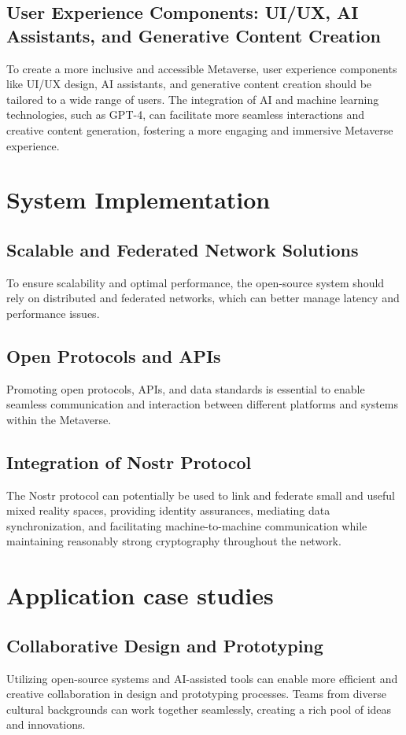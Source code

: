 \subsection{User Experience Components: UI/UX, AI Assistants, and Generative Content Creation}
To create a more inclusive and accessible Metaverse, user experience components like UI/UX design, AI assistants, and generative content creation should be tailored to a wide range of users. The integration of AI and machine learning technologies, such as GPT-4, can facilitate more seamless interactions and creative content generation, fostering a more engaging and immersive Metaverse experience.

\section{System Implementation}
\subsection{Scalable and Federated Network Solutions}
To ensure scalability and optimal performance, the open-source system should rely on distributed and federated networks, which can better manage latency and performance issues.
\subsection{Open Protocols and APIs}
Promoting open protocols, APIs, and data standards is essential to enable seamless communication and interaction between different platforms and systems within the Metaverse.
\subsection{Integration of Nostr Protocol}
The Nostr protocol can potentially be used to link and federate small and useful mixed reality spaces, providing identity assurances, mediating data synchronization, and facilitating machine-to-machine communication while maintaining reasonably strong cryptography throughout the network.


\section{Application case studies}
\subsection{Collaborative Design and Prototyping}
Utilizing open-source systems and AI-assisted tools can enable more efficient and creative collaboration in design and prototyping processes. Teams from diverse cultural backgrounds can work together seamlessly, creating a rich pool of ideas and innovations.

